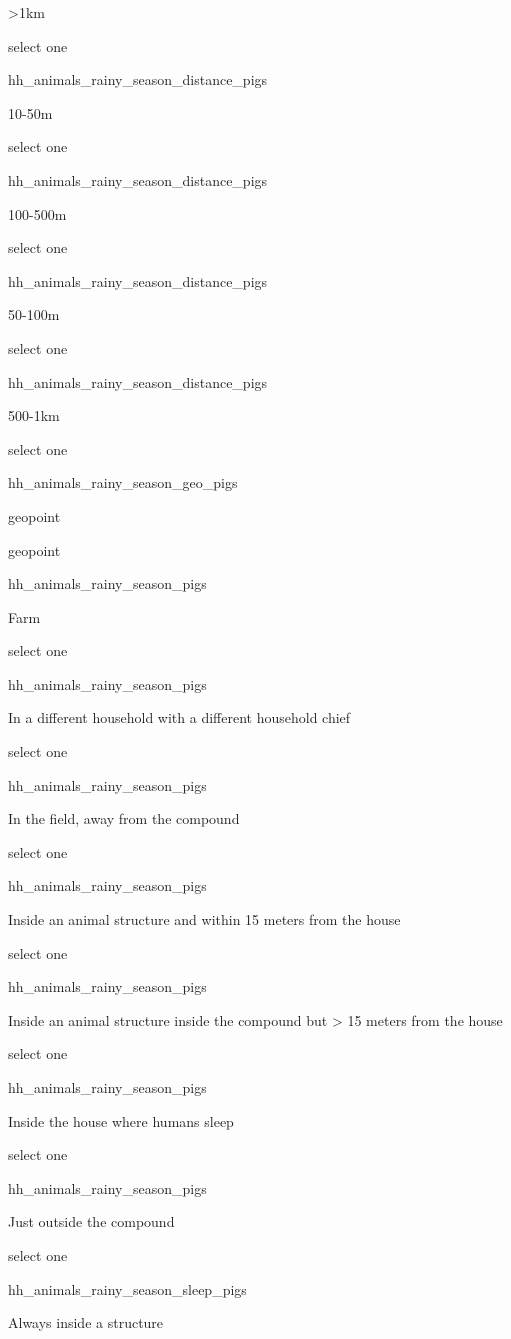 \documentclass[]{article}
\begin{document}
\textgreater{}1km

select one

hh\_animals\_rainy\_season\_distance\_pigs

10-50m

select one

hh\_animals\_rainy\_season\_distance\_pigs

100-500m

select one

hh\_animals\_rainy\_season\_distance\_pigs

50-100m

select one

hh\_animals\_rainy\_season\_distance\_pigs

500-1km

select one

hh\_animals\_rainy\_season\_geo\_pigs

geopoint

geopoint

hh\_animals\_rainy\_season\_pigs

Farm

select one

hh\_animals\_rainy\_season\_pigs

In a different household with a different household chief

select one

hh\_animals\_rainy\_season\_pigs

In the field, away from the compound

select one

hh\_animals\_rainy\_season\_pigs

Inside an animal structure and within 15 meters from the house

select one

hh\_animals\_rainy\_season\_pigs

Inside an animal structure inside the compound but \textgreater{} 15
meters from the house

select one

hh\_animals\_rainy\_season\_pigs

Inside the house where humans sleep

select one

hh\_animals\_rainy\_season\_pigs

Just outside the compound

select one

hh\_animals\_rainy\_season\_sleep\_pigs

Always inside a structure
\end{document}
